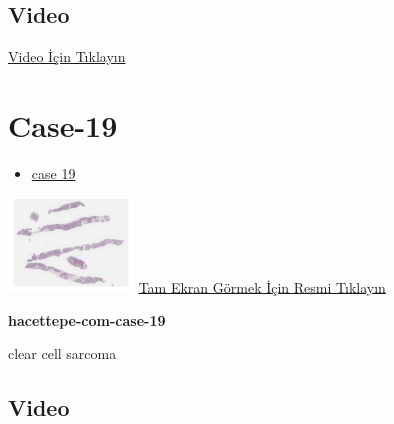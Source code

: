\documentclass[
  letterpaper,
  DIV=11,
  numbers=noendperiod]{scrreprt}
\providecommand{\tightlist}{%
  \setlength{\itemsep}{0pt}\setlength{\parskip}{0pt}}\usepackage{longtable,booktabs,array}
\begin{document}
\hypertarget{video-16}{%
\subsection{Video}\label{video-16}}

\href{https://www.youtube.com/watch?v=5c_5A4z6tro}{Video İçin Tıklayın}

\hypertarget{sec-hacettepe-case-of-the-month-case-19}{%
\section{Case-19}\label{sec-hacettepe-case-of-the-month-case-19}}

\begin{itemize}
\tightlist
\item
  \href{https://www.youtube.com/watch?v=SaNDCvKzQ6M\&ab_channel=KemalKosemehmetoglu}{case
  19}
\end{itemize}

\href{https://images.patolojiatlasi.com/hacettepe-com-case-1/HE.html}{\includegraphics[width=0.25\textwidth,height=\textheight]{./screenshots/thumbnail_hacettepe-com-case-19.png}}
\href{https://images.patolojiatlasi.com/hacettepe-com-case-19/HE.html}{Tam
Ekran Görmek İçin Resmi Tıklayın}

\textbf{hacettepe-com-case-19}

\begin{tcolorbox}[enhanced jigsaw, colbacktitle=quarto-callout-tip-color!10!white, colback=white, titlerule=0mm, opacityback=0, colframe=quarto-callout-tip-color-frame, opacitybacktitle=0.6, bottomrule=.15mm, breakable, coltitle=black, title=\textcolor{quarto-callout-tip-color}{\faLightbulb}\hspace{0.5em}{Tanı}, toprule=.15mm, toptitle=1mm, bottomtitle=1mm, arc=.35mm, rightrule=.15mm, leftrule=.75mm, left=2mm]

clear cell sarcoma

\end{tcolorbox}

\hypertarget{video-17}{%
\subsection{Video}\label{video-17}}
\end{document}
